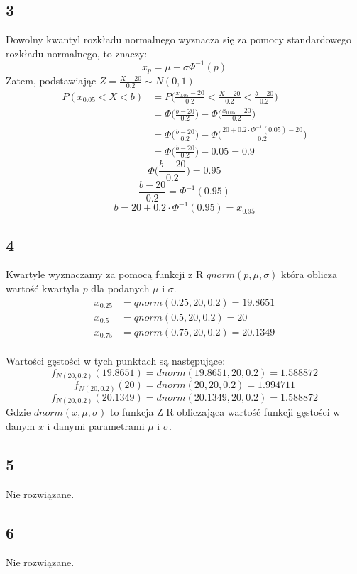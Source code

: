 \documentclass{article}
\begin{document}
\subsection*{3}
Dowolny kwantyl rozkładu normalnego wyznacza się za pomocy standardowego rozkładu normalnego, to znaczy:
$$x_{p} = \mu + \sigma\Phi^{-1}(p)$$
Zatem, podstawiając $Z = \frac{X-20}{0.2} \sim N(0,1)$
\begin{align*}
P(x_{0.05}<X<b) & = P\Big(\frac{x_{0.05}-20}{0.2}<\frac{X-20}{0.2}<\frac{b-20}{0.2}\Big) \\
& =  \Phi\Big(\frac{b-20}{0.2}\Big) - \Phi\Big(\frac{x_{0.05}-20}{0.2}\Big) \\
& =  \Phi\Big(\frac{b-20}{0.2}\Big) - \Phi\Big(\frac{20+0.2\cdot\Phi^{-1}(0.05)-20}{0.2}\Big) \\
& =  \Phi\Big(\frac{b-20}{0.2}\Big) - 0.05 = 0.9
\end{align*}
$$ \Phi\Big(\frac{b-20}{0.2}\Big) = 0.95$$
$$\frac{b-20}{0.2} = \Phi^{-1}(0.95)$$
$$b = 20 + 0.2\cdot\Phi^{-1}(0.95) = x_{0.95}$$

\subsection*{4}
Kwartyle wyznaczamy za pomocą funkcji z R $qnorm(p,\mu,\sigma)$ która oblicza wartość kwartyla $p$ dla podanych $\mu$ i $\sigma$.
\begin{align*}
x_{0.25} & = qnorm(0.25,20,0.2) = 19.8651 \\
x_{0.5} & = qnorm(0.5,20,0.2) = 20 \\
x_{0.75} & = qnorm(0.75,20,0.2) = 20.1349
\end{align*}
\\
Wartości gęstości w tych punktach są następujące:
$$f_{N(20,0.2)}(19.8651) = dnorm(19.8651,20,0.2) = 1.588872$$
$$f_{N(20,0.2)}(20) = dnorm(20,20,0.2) = 1.994711$$
$$f_{N(20,0.2)}(20.1349) = dnorm(20.1349,20,0.2) = 1.588872$$
Gdzie $dnorm(x,\mu,\sigma)$ to funkcja Z R obliczająca wartość funkcji gęstości w danym $x$ i danymi parametrami $\mu$ i $\sigma$.

\subsection*{5}
Nie rozwiązane.

\subsection*{6}
Nie rozwiązane.
\end{document}
